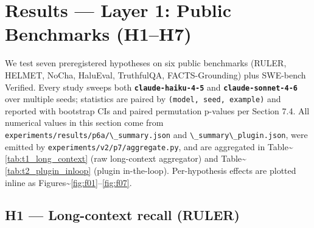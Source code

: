 \section{Results --- Layer 1: Public Benchmarks (H1--H7)}\label{results-layer-1-public-benchmarks-h1h7}

We test seven preregistered hypotheses on six public benchmarks (RULER, HELMET, NoCha, HaluEval, TruthfulQA, FACTS-Grounding) plus SWE-bench Verified. Every study sweeps both \textbf{\passthrough{\lstinline!claude-haiku-4-5!}} and \textbf{\passthrough{\lstinline!claude-sonnet-4-6!}} over multiple seeds; statistics are paired by \passthrough{\lstinline!(model, seed, example)!} and reported with bootstrap CIs and paired permutation p-values per Section 7.4. All numerical values in this section come from \passthrough{\lstinline!experiments/results/p6a/\_summary.json!} and \passthrough{\lstinline!\_summary\_plugin.json!}, were emitted by \passthrough{\lstinline!experiments/v2/p7/aggregate.py!}, and are aggregated in Table\textasciitilde{}\ref{tab:t1_long_context} (raw long-context aggregator) and Table\textasciitilde{}\ref{tab:t2_plugin_inloop} (plugin in-the-loop). Per-hypothesis effects are plotted inline as Figures\textasciitilde{}\ref{fig:f01}--\ref{fig:f07}.

\begin{table}[!tbp]
\centering
\caption{\textbf{T1 --- Layer-1 long-context aggregator (raw).} Headline rows for H1 and H2 with paired deltas, 95\% bootstrap CIs, paired permutation $p$-values, and Cohen's $d$. Source: \texttt{experiments/results/p6a/\_summary.json}.}
\label{tab:t1_long_context}
{\tiny\setlength{\tabcolsep}{2pt}%
}
\end{table}

\begin{table}[!tbp]
\centering
\caption{\textbf{T2 --- Layer-1 plugin in-the-loop.} Same hypotheses as T1 but with the shipped MCP plugin orchestrating the run; demonstrates that the discipline survives the indirection layer. Source: \texttt{experiments/results/p6a/\_summary\_plugin.json}.}
\label{tab:t2_plugin_inloop}
{\tiny\setlength{\tabcolsep}{2pt}%
}
\end{table}

\subsection{H1 --- Long-context recall (RULER)}\label{h1-long-context-recall-ruler}

